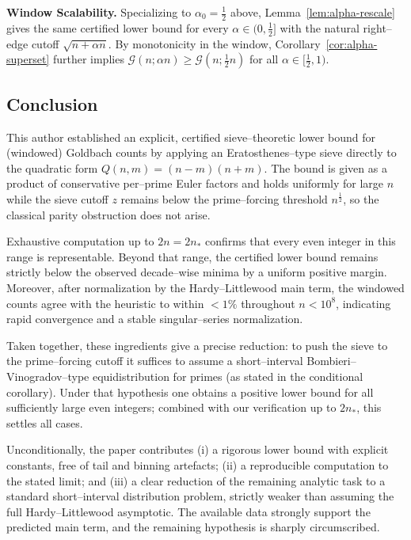 \documentclass[11pt]{article}
\theoremstyle{inline}
\theoremstyle{break}
\theoremstyle{break}
\theoremstyle{break}
\theoremstyle{break}
\theoremstyle{break}
\theoremstyle{break}
\theoremstyle{break}
\theoremstyle{inline}
\newcommand{\nprodstar}{n_{\ast}}  %
\begin{document}
\noindent\textbf{Window Scalability.}
Specializing to \(\alpha_0=\tfrac12\) above, Lemma~\ref{lem:alpha-rescale} gives the same certified lower bound for every \(\alpha\in(0,\tfrac12]\) with the natural right–edge cutoff \(\sqrt{n+\alpha n}\). 
By monotonicity in the window, Corollary~\ref{cor:alpha-superset} further implies \(\mathcal{G}(n;\alpha n)\ge \mathcal{G}(n;\tfrac12 n)\) for all \(\alpha\in[\tfrac12,1)\).

\subsection{Conclusion}\label{sec:conclusion}
This author established an explicit, certified sieve–theoretic lower bound for (windowed) Goldbach counts by applying an Eratosthenes–type sieve directly to the quadratic form \(Q(n,m)=(n-m)(n+m)\). The bound is given as a product of conservative per–prime Euler factors and holds uniformly for large \(n\) while the sieve cutoff \(z\) remains below the prime–forcing threshold \(n^{\frac{1}{2}}\), so the classical parity obstruction does not arise.

Exhaustive computation up to \(2n=2\nprodstar\) confirms that every even integer in this range is representable. Beyond that range, the certified lower bound remains strictly below the observed decade–wise minima by a uniform positive margin. Moreover, after normalization by the Hardy–Littlewood main term, the windowed counts agree with the heuristic to within \(<1\%\) throughout \(n < 10^{8}\), indicating rapid convergence and a stable singular–series normalization.

Taken together, these ingredients give a precise reduction: to push the sieve to the prime–forcing cutoff it suffices to assume a short–interval Bombieri–Vinogradov–type equidistribution for primes (as stated in the conditional corollary). Under that hypothesis one obtains a positive lower bound for all sufficiently large even integers; combined with our verification up to \(2\nprodstar\), this settles all cases.

Unconditionally, the paper contributes (i) a rigorous lower bound with explicit constants, free of tail and binning artefacts; (ii) a reproducible computation to the stated limit; and (iii) a clear reduction of the remaining analytic task to a standard short–interval distribution problem, strictly weaker than assuming the full Hardy–Littlewood asymptotic. The available data strongly support the predicted main term, and the remaining hypothesis is sharply circumscribed.
\end{document}
